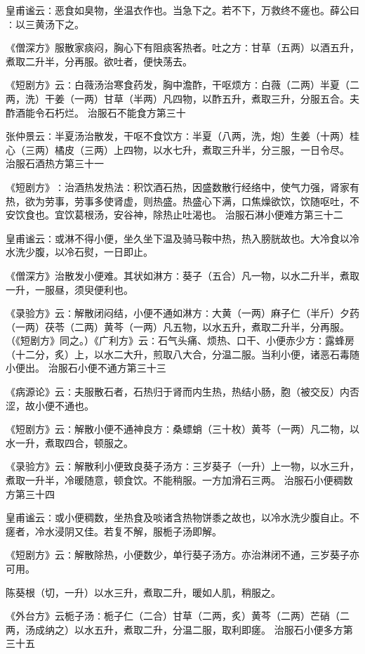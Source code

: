 \documentclass[a4paper,12pt,UTF8,twoside]{ctexbook}
\begin{document}
皇甫谧云∶恶食如臭物，坐温衣作也。当急下之。若不下，万救终不瘥也。薛公曰∶以三黄汤下之。

《僧深方》服散家痰闷，胸心下有阻痰客热者。吐之方∶甘草（五两）以酒五升，煮取二升半，分再服。欲吐者，便快荡去。

《短剧方》云∶白薇汤治寒食药发，胸中澹酢，干呕烦方∶白薇（二两）半夏（二两，洗）干姜（一两）甘草（半两）凡四物，以酢五升，煮取三升，分服五合。夫酢酒能令石朽烂。
治服石不能食方第三十

张仲景云∶半夏汤治散发，干呕不食饮方∶半夏（八两，洗，炮）生姜（十两）桂心（三两）橘皮（三两）上四物，以水七升，煮取三升半，分三服，一日令尽。
治服石酒热方第三十一

《短剧方》∶治酒热发热法∶积饮酒石热，因盛数散行经络中，使气力强，肾家有热，欲为劳事，劳事多使肾虚，则热盛。热盛心下满，口焦燥欲饮，饮随呕吐，不安饮食也。宜饮葛根汤，安谷神，除热止吐渴也。
治服石淋小便难方第三十二

皇甫谧云∶或淋不得小便，坐久坐下温及骑马鞍中热，热入膀胱故也。大冷食以冷水洗少腹，以冷石熨，一日即止。

《僧深方》治散发小便难。其状如淋方∶葵子（五合）凡一物，以水二升半，煮取一升，一服昼，须臾便利也。

《录验方》云∶解散闭闷结，小便不通如淋方∶大黄（一两）麻子仁（半斤）夕药（一两）茯苓（二两）黄芩（一两）凡五物，以水五升，煮取二升半，分再服。（《短剧方》同之。）《广利方》云∶石气头痛、烦热、口干、小便赤少方∶露蜂房（十二分，炙）上，以水二大升，煎取八大合，分温二服。当利小便，诸恶石毒随小便出。
治服石小便不通方第三十三

《病源论》云∶夫服散石者，石热归于肾而内生热，热结小肠，胞（被交反）内否涩，故小便不通也。

《短剧方》云∶解散小便不通神良方∶桑螵蛸（三十枚）黄芩（一两）凡二物，以水一升，煮取四合，顿服之。

《录验方》云∶解散利小便致良葵子汤方∶三岁葵子（一升）上一物，以水三升，煮取一升半，冷暖随意，顿食饮。不能稍服。一方加滑石三两。
治服石小便稠数方第三十四

皇甫谧云∶或小便稠数，坐热食及啖诸含热物饼黍之故也，以冷水洗少腹自止。不瘥者，冷水浸阴又佳。若复不解，服栀子汤即解。

《短剧方》云∶解散除热，小便数少，单行葵子汤方。亦治淋闭不通，三岁葵子亦可用。

陈葵根（切，一升）以水三升，煮取二升，暖如人肌，稍服之。

《外台方》云栀子汤∶栀子仁（二合）甘草（二两，炙）黄芩（二两）芒硝（二两，汤成纳之）以水五升，煮取二升，分温二服，取利即瘥。
治服石小便多方第三十五
\end{document}
